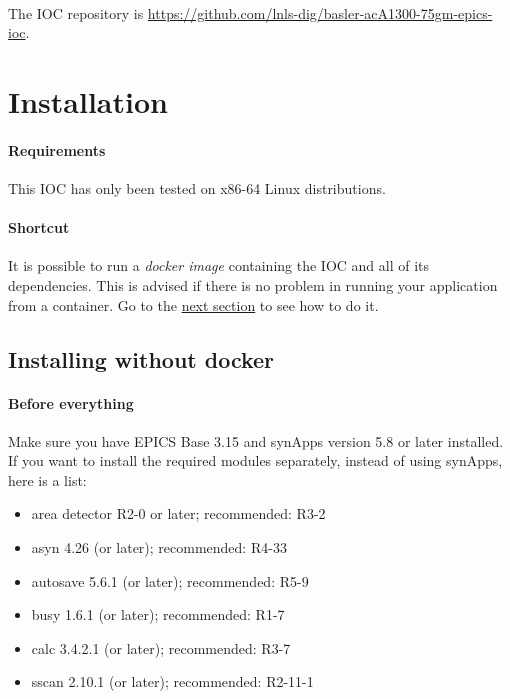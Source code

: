 \documentclass[openany]{article}
\begin{document}
\paragraph{} The IOC repository is \url{https://github.com/lnls-dig/basler-acA1300-75gm-epics-ioc}.

\section{Installation}

    \paragraph{Requirements} This IOC has only been tested on x86-64 Linux distributions.

    \paragraph{Shortcut} It is possible to run a \emph{docker image} containing the IOC and all of its dependencies. This is advised if there is no problem in running your application from a container. Go to the \hyperref[sec:run-with-docker]{next section} to see how to do it.

    \subsection{Installing without docker}

        \paragraph{Before everything} Make sure you have EPICS Base 3.15 and synApps version 5.8 or later installed. If you want to install the required modules separately, instead of using synApps, here is a list:

        \begin{itemize}
          \item area detector R2-0 or later; recommended: R3-2
          \item asyn 4.26 (or later); recommended: R4-33
          \item autosave 5.6.1 (or later); recommended: R5-9
          \item busy 1.6.1 (or later); recommended: R1-7
          \item calc 3.4.2.1 (or later); recommended: R3-7
          \item sscan 2.10.1 (or later); recommended: R2-11-1
        \end{itemize} 
\end{document}
